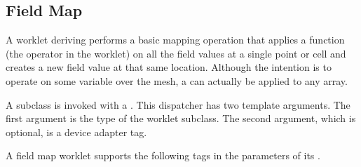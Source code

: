 \subsection{Field Map}


A worklet deriving  performs a basic mapping
operation that applies a function (the operator in the worklet) on all the
field values at a single point or cell and creates a new field value at
that same location. Although the intention is to operate on some variable
over the mesh, a  can actually be applied
to any array.

A  subclass is invoked with a
. This dispatcher has two template
arguments. The first argument is the type of the worklet subclass. The
second argument, which is optional, is a device adapter tag.

A field map worklet supports the following tags in the parameters of its
\controlsignature.

